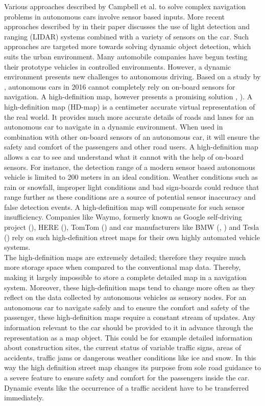 Various approaches described by Campbell et al. to solve complex navigation problems in autonomous cars involve sensor based inputs. More recent approaches described by \citet{levinson2011towards} in their paper discusses the use of light detection and ranging (LIDAR) systems combined with a variety of sensors on the car. Such approaches are targeted more towards solving dynamic object detection, which suits the urban environment. Many automobile companies have begun testing their prototype vehicles in controlled environments. However, a dynamic environment presents new challenges to autonomous driving. Based on a study by \citet{aeberhard2015experience}, autonomous cars in 2016 cannot completely rely on on-board sensors for navigation. A high-definition map, however presents a promising solution  \cite{360hdmaps}, \cite{hdmapauto}). A high-definition map (HD-map) is a centimeter accurate virtual representation of the real world. It provides much more accurate details of roads and lanes for an autonomous car to navigate in a dynamic environment. When used in combination with other on-board sensors of an autonomous car, it will ensure the safety and comfort of the passengers and other road users. A high-definition map allows a car to see and understand what it cannot with the help of on-board sensors. For instance, the detection range of a modern sensor based autonomous vehicle is limited to 200 meters in an ideal condition. Weather conditions such as rain or snowfall, improper light conditions and bad sign-boards could reduce that range further as these conditions are a source of potential sensor inaccuracy and false detection events. A high-definition map will compensate for such sensor insufficiency. Companies like Waymo, formerly known as Google self-driving project (\citet{madrigal}), HERE (\citet{stevenson}), TomTom (\cite{tomtom}) and car manufacturers like BMW (\citet{bender2014lanelets}, \citet{aeberhard2015experience}) and Tesla (\citet{perkins}) rely on such high-definition street maps for their own highly automated vehicle systems. \\


The high-definition maps are extremely detailed; therefore they require much more storage space when compared to the conventional map data. Thereby, making it largely impossible to store a complete detailed map in a navigation system. Moreover, these high-definition maps tend to change more often as they reflect on the data collected by autonomous vehicles as sensory nodes. For an autonomous car to navigate safely and to ensure the comfort and safety of the passenger, these high-definition maps require a constant stream of updates. Any information relevant to the car should be provided to it in advance through the representation as a map object. This could be for example detailed information about construction sites, the current status of variable traffic signs, areas of accidents, traffic jams or dangerous weather conditions like ice and snow. In this way the high definition street map changes its purpose from sole road guidance to a severe feature to ensure safety and comfort for the passengers inside the car. Dynamic events like the occurrence of a traffic accident have to be transferred immediately. \\ 
 
